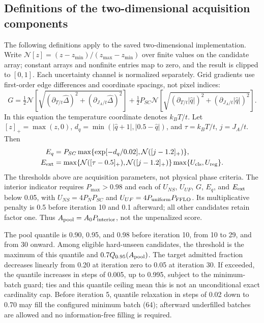 \subsection{Definitions of the two-dimensional acquisition components}\label{sec:acq-definitions}
The following definitions apply to the saved two-dimensional implementation. Write $\mathcal N[z]=(z-z_{\min})/(z_{\max}-z_{\min})$ over finite values on the candidate array; constant arrays and nonfinite entries map to zero, and the result is clipped to $[0,1]$. Each uncertainty channel is normalized separately. Grid gradients use first-order edge differences and coordinate spacings, not pixel indices:
\begin{equation}
G=\tfrac12\mathcal N\!\left[\sqrt{(\partial_{T/t}\hat\Delta)^2+(\partial_{J_A/t}\hat\Delta)^2}\right]
+\tfrac12 P_{SC}\mathcal N\!\left[\sqrt{(\partial_{T/t}|\hat q|)^2+(\partial_{J_A/t}|\hat q|)^2}\right].\label{eq:gradient}
\end{equation}
In this equation the temperature coordinate denotes $k_BT/t$. Let $[z]_+=\max(z,0)$, $d_q=\min(|\hat q+1|,|0.5-\hat q|)$, and $\tau=k_BT/t$, $j=J_A/t$. Then
\begin{align}
E_q&=P_{SC}\max\{\exp[-d_q/0.02],\mathcal N([j-1.2]_+)\},\label{eq:eq-risk}\\
E_{\rm ext}&=\max\{\mathcal N([\tau-0.5]_+),\mathcal N([j-1.2]_+)\}\max\{U_{\rm cls},U_{\rm reg}\}.\label{eq:extrapolation}
\end{align}
The thresholds above are acquisition parameters, not physical phase criteria. The interior indicator requires $P_{\max}>0.98$ and each of $U_{NS}$, $U_{UF}$, $G$, $E_q$, and $E_{\rm ext}$ below 0.05, with $U_{NS}=4P_NP_{SC}$ and $U_{UF}=4P_{\rm uniform}P_{\rm FFLO}$. Its multiplicative penalty is 0.5 before iteration 10 and 0.1 afterward; all other candidates retain factor one. Thus $A_{\rm pool}=A_0P_{\rm interior}$, not the unpenalized score.

The pool quantile is 0.90, 0.95, and 0.98 before iteration 10, from 10 to 29, and from 30 onward. Among eligible hard-unseen candidates, the threshold is the maximum of this quantile and $0.7Q_{0.95}(A_{\rm pool})$. The target admitted fraction decreases linearly from 0.20 at iteration zero to 0.05 at iteration 30. If exceeded, the quantile increases in steps of 0.005, up to 0.995, subject to the minimum-batch guard; ties and this quantile ceiling mean this is not an unconditional exact cardinality cap. Before iteration 5, quantile relaxation in steps of 0.02 down to 0.70 may fill the configured minimum batch (64); afterward underfilled batches are allowed and no information-free filling is required.

